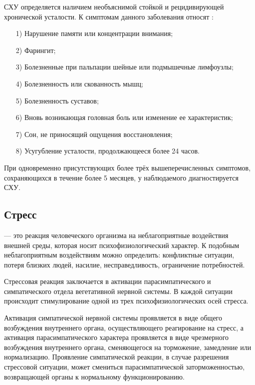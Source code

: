 СХУ определяется наличием необъяснимой стойкой и рецидивирующей хронической усталости. К симптомам данного заболевания относят \cite{syndromOfChrono}:
\begin{itemize}[leftmargin=1.6\parindent]
\item[1)] Нарушение памяти или концентрации внимания;
\item[2)] Фарингит;
\item[3)] Болезненные при пальпации шейные или подмышечные лимфоузлы;
\item[4)] Болезненность или скованность мышц;
\item[5)] Болезненность суставов;
\item[6)] Вновь возникающая головная боль или изменение ее характеристик;
\item[7)] Сон, не приносящий ощущения восстановления;
\item[8)] Усугубление усталости, продолжающееся более 24 часов.
\end{itemize}

При одновременно присутствующих более трёх вышеперечисленных симптомов, сохраняющихся в течение более 5 месяцев, у наблюдаемого диагностируется СХУ. \cite{syndromOfChrono}


\subsection{Стресс}
 --- это реакция человеческого организма на неблагоприятные воздействия внешней среды, которая носит психофизиологический характер. К подобным неблагоприятным воздействиям можно определить: конфликтные ситуации, потеря близких людей, насилие, несправедливость, ограничение потребностей. \cite{neuroPhysicalMechasmsOfStress}

Стрессовая реакция заключается в активации парасимпатического и симпатического отдела вегетативной нервной системы. В каждой ситуации происходит стимулирование одной из трех психофизиологических осей стресса. \cite{neuroPhysicalMechasmsOfStress}

Активация симпатической нервной системы проявляется в виде общего возбуждения внутреннего органа, осуществляющего реагирование на стресс, а активация парасимпатического характера проявляется в виде чрезмерного возбуждения внутреннего органа, сменяющегося на торможение, замедление или нормализацию. Проявление симпатической реакции, в случае разрешения стрессовой ситуации, может смениться парасимпатической заторможенностью, возвращающей органы к нормальному функционированию. \cite{neuroPhysicalMechasmsOfStress}

